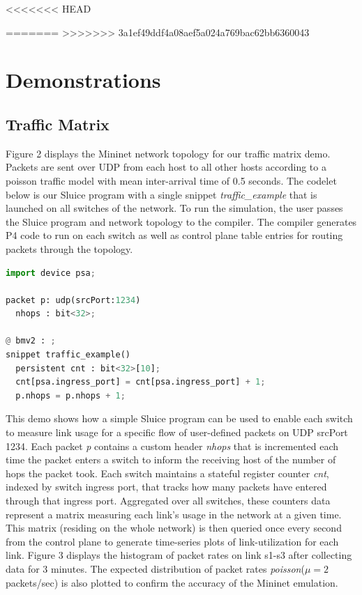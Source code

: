 <<<<<<< HEAD

=======
>>>>>>> 3a1ef49ddf4a08aef5a024a769bac62bb6360043



\section{Demonstrations}
 
\subsection{Traffic Matrix}

Figure 2 displays the Mininet network topology for our traffic matrix demo.
Packets are sent over UDP from each host to all other hosts according to a
poisson traffic model with mean inter-arrival time of 0.5 seconds. The codelet
below is our Sluice program with a single snippet \textit{traffic\_example}
that is launched on all switches of the network. To run the simulation, the
user passes the Sluice program and network topology to the compiler. The
compiler generates P4 code to run on each switch as well as control plane table
entries for routing packets through the topology.

\begin{lstlisting}[language=Python, basicstyle=\scriptsize]
import device psa;

packet p: udp(srcPort:1234)
  nhops : bit<32>;

@ bmv2 : ;
snippet traffic_example()
  persistent cnt : bit<32>[10];
  cnt[psa.ingress_port] = cnt[psa.ingress_port] + 1;
  p.nhops = p.nhops + 1;
\end{lstlisting}

This demo shows how a simple Sluice program can be used to enable each switch
to measure link usage for a specific flow of user-defined packets on UDP
srcPort 1234. Each packet \textit{p} contains a custom header \textit{nhops}
that is incremented each time the packet enters a switch to inform the
receiving host of the number of hops the packet took. Each switch maintains a
stateful register counter \textit{cnt}, indexed by switch ingress port, that
tracks how many packets have entered through that ingress port. Aggregated over
all switches, these counters data represent a matrix measuring each link's
usage in the network at a given time. This matrix (residing on the whole
network) is then queried once every second from the control plane to generate
time-series plots of link-utilization for each link. Figure 3 displays the
histogram of packet rates on link s1-s3 after collecting data for 3 minutes.
The expected distribution of packet rates \textit{poisson}($\mu = 2$
packets/sec) is also plotted to confirm the accuracy of the Mininet emulation.

